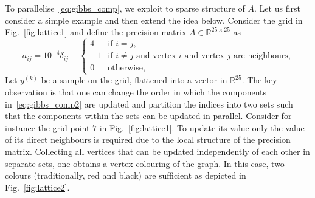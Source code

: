 \documentclass[
fontsize=11pt,
paper=a4,
numbers=noenddot
]{scrartcl}
\begin{document}
To parallelise~\eqref{eq:gibbs_comp}, we exploit to sparse structure of $A$. Let us first consider a simple example and then extend the idea below. Consider the grid in Fig.~\ref{fig:lattice1} and define the precision matrix $A \in \mathbb{R}^{25 \times 25}$ as
\begin{equation*}
   a_{ij} = 
   10^{-4} \delta_{ij} + 
    \begin{cases}
        4 & \text{if $i = j$,} \\
        -1 &  \text{if $i \neq j$ and vertex $i$ and vertex $j$ are neighbours,} \\
        0 & \text{otherwise,}
    \end{cases}
\end{equation*} 
Let $y^{(k)}$ be a sample on the grid, flattened into a vector in $\mathbb{R}^{25}$. The key observation is that one can change the order in which the components in~\eqref{eq:gibbs_comp2} are updated and partition the indices into two sets such that the components within the sets can be updated in parallel. Consider for instance the grid point $7$ in Fig.~\ref{fig:lattice1}. To update its value only the value of its direct neighbours is required due to the local structure of the precision matrix. Collecting all vertices that can be updated independently of each other in separate sets, one obtains a vertex colouring of the graph. In this case, two colours (traditionally, red and black) are sufficient as depicted in Fig.~\ref{fig:lattice2}.
\end{document}
